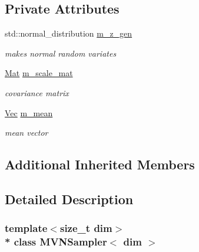 \subsection*{Private Attributes}
\begin{DoxyCompactItemize}
\item 
std\+::normal\+\_\+distribution \hyperlink{classMVNSampler_a4b68c9586aa0b10f27437aebb370869f}{m\+\_\+z\+\_\+gen}\hypertarget{classMVNSampler_a4b68c9586aa0b10f27437aebb370869f}{}\label{classMVNSampler_a4b68c9586aa0b10f27437aebb370869f}

\begin{DoxyCompactList}\small\item\em makes normal random variates \end{DoxyCompactList}\item 
\hyperlink{classMVNSampler_a008de968c985ee41633d53d25174701f}{Mat} \hyperlink{classMVNSampler_a59c5a532bceb4156205d32d239458696}{m\+\_\+scale\+\_\+mat}\hypertarget{classMVNSampler_a59c5a532bceb4156205d32d239458696}{}\label{classMVNSampler_a59c5a532bceb4156205d32d239458696}

\begin{DoxyCompactList}\small\item\em covariance matrix \end{DoxyCompactList}\item 
\hyperlink{classMVNSampler_a409f73d7a66202b7ecff0f86e9afe3c1}{Vec} \hyperlink{classMVNSampler_abe79aa245de63b44eb25c1fa56cffb73}{m\+\_\+mean}\hypertarget{classMVNSampler_abe79aa245de63b44eb25c1fa56cffb73}{}\label{classMVNSampler_abe79aa245de63b44eb25c1fa56cffb73}

\begin{DoxyCompactList}\small\item\em mean vector \end{DoxyCompactList}\end{DoxyCompactItemize}
\subsection*{Additional Inherited Members}


\subsection{Detailed Description}
\subsubsection*{template$<$size\+\_\+t dim$>$\\*
class M\+V\+N\+Sampler$<$ dim $>$}

